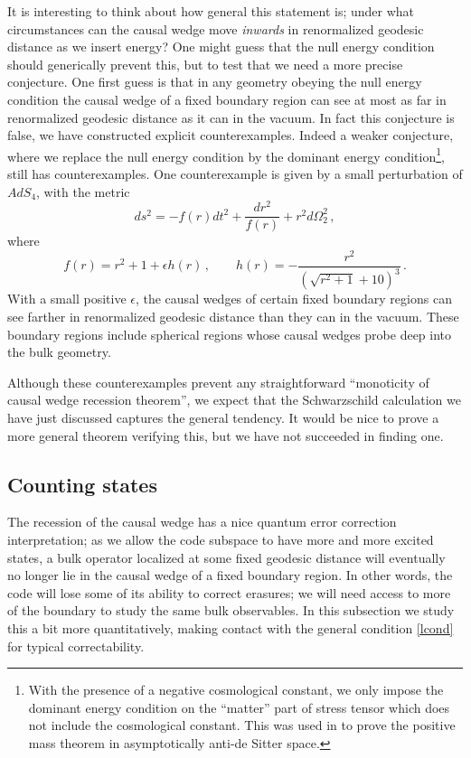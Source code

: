 \documentclass[11pt]{article}
\newcommand{\be}{\begin{equation}}
\newcommand{\ee}{\end{equation}}
\begin{document}
It is interesting to think about how general this statement is; under what circumstances can the causal wedge move \textit{inwards} in renormalized geodesic distance as we insert energy?  One might guess that the null energy condition should generically prevent this, but to test that we need a more precise conjecture.  One first guess is that in any geometry obeying the null energy condition the causal wedge of a fixed boundary region can see at most as far in renormalized geodesic distance as it can in the vacuum.  In fact this conjecture is false, we have constructed explicit counterexamples.  Indeed a weaker conjecture, where we replace the null energy condition by the dominant energy condition\footnote{With the presence of a negative cosmological constant, we only impose the dominant energy condition on the ``matter'' part of stress tensor which does not include the cosmological constant.  This was used in \cite{Gibbons:1982jg} to prove the positive mass theorem in asymptotically anti-de Sitter space.}, still has counterexamples.  One counterexample is given by a small perturbation of $AdS_4$, with the metric
\be
ds^2 = -f(r) dt^2 + \frac{dr^2}{f(r)} + r^2 d\Omega_2^2 \,,
\ee
where
\be
f(r) = r^2 + 1 + \epsilon h(r) \,,\qquad
h(r) = -\frac{r^2}{\left(\sqrt{r^2+1}+10\right)^3} \,.
\ee
With a small positive $\epsilon$, the causal wedges of certain fixed boundary regions can see farther in renormalized geodesic distance than they can in the vacuum.  These boundary regions include spherical regions whose causal wedges probe deep into the bulk geometry.

Although these counterexamples prevent any straightforward ``monoticity of causal wedge recession theorem'', we expect that the Schwarzschild calculation we have just discussed captures the general tendency.  It would be nice to prove a more general theorem verifying this, but we have not succeeded in finding one.



\subsection{Counting states}\label{countstate}
The recession of the causal wedge has a nice quantum error correction interpretation; as we allow the code subspace to have more and more excited states, a bulk operator localized at some fixed geodesic distance will eventually no longer lie in the causal wedge of a fixed boundary region.  In other words, the code will lose some of its ability to correct erasures; we will need access to more of the boundary to study the same bulk observables.   In this subsection we study this a bit more quantitatively, making contact with the general condition \eqref{lcond} for typical correctability.  
\end{document}
